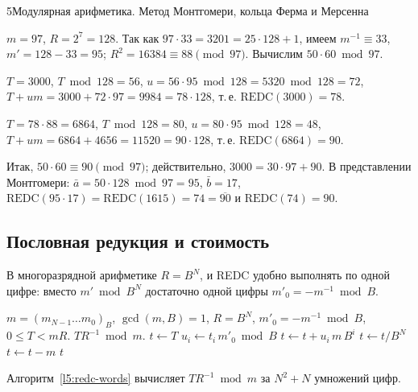 \begin{lecture}{5}{Модулярная арифметика. Метод Монтгомери, кольца Ферма и Мерсенна}
\begin{example}\label{l5:redc-hand}
$m = 97$, $R = 2^7 = 128$. Так как $97 \cdot 33 = 3201 = 25 \cdot 128 + 1$, имеем
$m^{-1} \equiv 33$, $m' = 128 - 33 = 95$; $R^2 = 16384 \equiv 88 \pmod{97}$.
Вычислим $50 \cdot 60 \bmod 97$.

$T = 3000$, $T \bmod 128 = 56$, $u = 56 \cdot 95 \bmod 128 = 5320 \bmod 128 = 72$,
$T + um = 3000 + 72 \cdot 97 = 9984 = 78 \cdot 128$, т.\,е. $\mathrm{REDC}(3000) = 78$.

$T = 78 \cdot 88 = 6864$, $T \bmod 128 = 80$, $u = 80 \cdot 95 \bmod 128 = 48$,
$T + um = 6864 + 4656 = 11520 = 90 \cdot 128$, т.\,е. $\mathrm{REDC}(6864) = 90$.

Итак, $50 \cdot 60 \equiv 90 \pmod{97}$; действительно, $3000 = 30 \cdot 97 + 90$. В
представлении Монтгомери: $\bar a = 50 \cdot 128 \bmod 97 = 95$, $\bar b = 17$,
$\mathrm{REDC}(95 \cdot 17) = \mathrm{REDC}(1615) = 74 = \overline{90}$ и
$\mathrm{REDC}(74) = 90$.
\end{example}


\subsection{Пословная редукция и стоимость}

В многоразрядной арифметике $R = B^N$, и REDC удобно выполнять по одной цифре: вместо
$m' \bmod B^N$ достаточно одной цифры $m'_0 = -m^{-1} \bmod B$.

\begin{algorithm}\label{l5:redc-words}
\begin{algorithmic}[1]
\Require $m = (m_{N-1} \dots m_0)_B$, $\gcd(m, B) = 1$, $R = B^N$,
  $m'_0 = -m^{-1} \bmod B$, $0 \le T < mR$.
\Ensure $TR^{-1} \bmod m$.
\State $t \gets T$
  \State $u_i \gets t_i\, m'_0 \bmod B$ 
  \State $t \gets t + u_i\, m\, B^i$ 
\EndFor
\State $t \gets t / B^N$ 
 \State $t \gets t - m$ \EndIf
\State \Return $t$
\end{algorithmic}
\end{algorithm}

\begin{proposition}\label{l5:redc-words-ok}
Алгоритм~\ref{l5:redc-words} вычисляет $TR^{-1} \bmod m$ за $N^2 + N$ умножений цифр.
\end{proposition}


\end{lecture}
